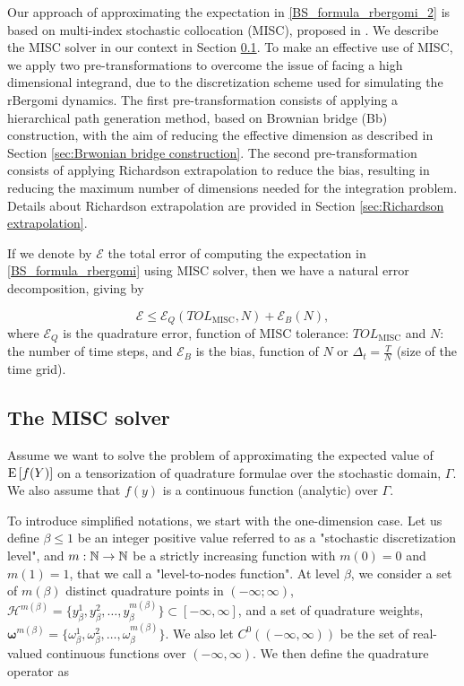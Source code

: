 Our approach of approximating the expectation in \eqref{BS_formula_rbergomi_2} is based on multi-index stochastic collocation (MISC), proposed in \cite{haji2016multi}. We describe the  MISC solver in our context in Section \ref{sec:Details of the MISC}.  To make an effective use of MISC, we apply two pre-transformations to overcome the issue of facing a high dimensional integrand, due to the discretization scheme used for simulating the rBergomi dynamics. The first pre-transformation consists of applying a hierarchical  path generation method, based on Brownian
bridge (Bb) construction, with the aim of reducing the effective dimension as  described  in Section \ref{sec:Brwonian bridge construction}. The second pre-transformation consists of applying Richardson extrapolation to reduce the bias, resulting in reducing  the maximum number of dimensions needed for the integration problem. Details about  Richardson extrapolation  are provided in Section \ref{sec:Richardson extrapolation}.




If we denote by $\mathcal{E}$ the total error of computing the  expectation in \eqref{BS_formula_rbergomi} using MISC solver, then we have a natural error decomposition, giving by
 
\begin{equation}\label{eq:total_error}
\mathcal{E} \le \mathcal{E}_Q(TOL_{\text{MISC}},N) + \mathcal{E}_B(N),
\end{equation}
where  $\mathcal{E}_Q$ is the quadrature error, function of MISC tolerance:  $TOL_{\text{MISC}}$ and $N$: the number of time steps,  and  $\mathcal{E}_B$  is the bias, function of $N$  or $\Delta_t=\frac{T}{N}$ (size of the time grid).




\subsection{The MISC solver}\label{sec:Details of the MISC}

Assume we want to  solve the problem of  approximating the expected value of $\mathrm{E}\left[f(Y)\right]$ on a tensorization of quadrature formulae over the stochastic domain, $\Gamma$. We also  assume that $f(y)$ is a continuous function (analytic) over $\Gamma$. 

To introduce simplified notations, we start with the one-dimension case. Let us define $\beta \le 1$ be an integer positive value referred to as a "stochastic discretization level", and $m: \mathbb{N} \rightarrow \mathbb{N}$ be a strictly increasing function with $m(0)=0$ and $m(1)=1$, that we call a "level-to-nodes function". At level $\beta$, we consider a set of $m(\beta)$ distinct quadrature points in $(-\infty; \infty)$, $\mathcal{H}^{m(\beta)}=\{y^1_\beta,y^2_\beta,\dots,y_\beta^{m(\beta)}\} \subset [-\infty,\infty]$, and a set of quadrature weights, $\boldsymbol{\omega}^{m(\beta)}=\{\omega^1_\beta,\omega^2_\beta,\dots,\omega_\beta^{m(\beta)}\}$. We also let $C^0((-\infty,\infty))$ be the set of real-valued continuous functions over $(-\infty, \infty)$. We then define the quadrature operator as


